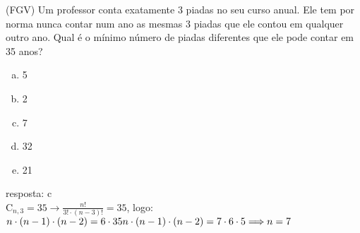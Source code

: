 \begin{ex}
(FGV) Um professor conta exatamente 3 piadas no seu curso anual. Ele tem por norma nunca contar num ano as mesmas 3 piadas que ele contou em qualquer outro ano. Qual é o mínimo número de piadas diferentes que ele pode contar em 35 anos?
   \begin{enumerate}[(a)]
   \item 5
   \item 2
   \item 7
   \item 32
   \item 21
   \end{enumerate}
     \begin{sol}
       resposta: c \\
       $\mathrm{C}_{n,3}= 35 \longrightarrow \frac{n!}{3!\cdot(n-3)!}=35$, \hspace{0,2cm} logo: 
       $n\cdot(n-1)\cdot(n-2)=6\cdot35 \\  n\cdot(n-1)\cdot(n-2)=7\cdot6\cdot5\Longrightarrow n=7$
     \end{sol}
\end{ex}